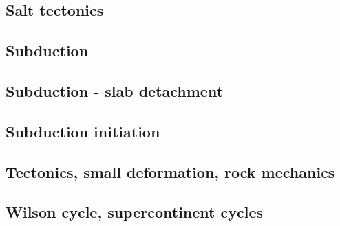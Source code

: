 \subsection*{Salt tectonics}

\cite{tars91}
\cite{zaju92}
\cite{nabr93}
\cite{istt04}
\cite{huja07}

\subsection*{Subduction}

\cite{thar85}
\cite{jarr86}
\cite{boww89}
\cite{hstt90}
\cite{zhgu92}\cite{whbw92}
\cite{jope93}\cite{dvnm93}
\cite{zhgu94}\cite{wibe94}\cite{wdbo94a}\cite{wdbo94b}
\cite{hajc97}
\cite{itki98}
\cite{hagu99}
\cite{tesc00}
\cite{refm03}
\cite{toba04}
\cite{jalo05}\cite{lahb05}
\cite{degw06}\cite{rohu06}
\cite{artd07}\cite{yaab07}
\cite{yaba08}\cite{ozrs08}\cite{dihf08}\cite{wabj08}\cite{wabj08b}
\cite{yahb09}
\cite{hagr10}\cite{lobh10}
\cite{lixg11}\cite{list11}
\cite{anwb12}\cite{jahu12}\cite{jabi12}\cite{jabk12}\cite{lixg12}\cite{lixg13}\cite{ronb12}\cite{tebu12}
\cite{thka12}
\cite{nabg13}\cite{hage13}\cite{ancv13}\cite{namu13}\cite{yosh13}\cite{zhgt13}\cite{jabr13}\cite{izht13}
\cite{luws13}\cite{dusc13}\cite{tibb13}
\cite{robn14}\cite{hond14}\cite{ronc14}
\cite{tomy16}

\subsection*{Subduction - slab detachment}

\cite{wosp92}
\cite{yowo95}
\cite{wowo97}
\cite{desw98}
\cite{wosp00}
\cite{anbi09}
\cite{dugm11}
\cite{dugk12}
\cite{dusg12}
\cite{dugs14}

\subsection*{Subduction initiation}

\cite{togu98}
\cite{dohe01}\cite{reyb01}
\cite{hags03}
\cite{nigm10}
\cite{dyge13}


\subsection*{Tectonics, small deformation, rock mechanics}

\cite{ilma93}
\cite{hept96}
\cite{lega12}

\subsection*{Wilson cycle, supercontinent cycles}

\cite{trry95}
\cite{zhzl07}
\cite{zhzm09}





